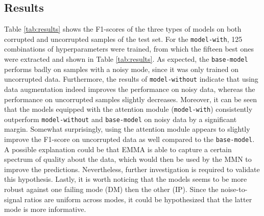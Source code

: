 \subsection{Results}
Table \ref{tab:results} shows the F1-scores of the three types of models on both corrupted and uncorrupted samples of the test set. For the \texttt{model-with}, 125 combinations of hyperparameters were trained, from which the fifteen best ones were extracted and shown in Table \ref{tab:results}. As expected, the \texttt{base-model} performs badly on samples with a noisy mode, since it was only trained on uncorrupted data. Furthermore, the results of \texttt{model-without} indicate that using data augmentation indeed improves the performance on noisy data, whereas the performance on uncorrupted samples slightly decreases. Moreover, it can be seen that the models equipped with the attention module (\texttt{model-with}) consistently outperform \texttt{model-without} and \texttt{base-model} on noisy data by a significant margin. Somewhat surprisingly, using the attention module appears to slightly improve the F1-score on uncorrupted data as well compared to the \texttt{base-model}. A possible explanation could be that EMMA is able to capture a certain spectrum of quality about the data, which would then be used by the MMN to improve the predictions. Nevertheless, further investigation is required to validate this hypothesis. Lastly, it is worth noticing that the models seems to be more robust against one failing mode (DM) then the other (IP). Since the noise-to-signal ratios are uniform across modes, it could be hypothesized that the latter mode is more informative.
